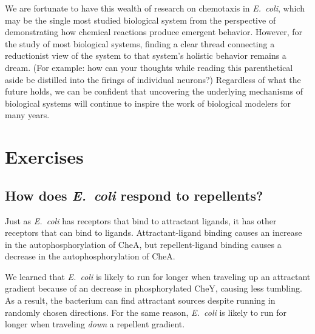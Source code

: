 We are fortunate to have this wealth of research on chemotaxis in \textit{E.~coli}, which may be the single most studied biological system from the perspective of demonstrating how chemical reactions produce emergent behavior. However, for the study of most biological systems, finding a clear thread connecting a reductionist view of the system to that system's holistic behavior remains a dream. (For example: how can your thoughts while reading this parenthetical aside be distilled into the firings of individual neurons?)  Regardless of what the future holds, we can be confident that uncovering the underlying mechanisms of biological systems will continue to inspire the work of biological modelers for many years.\\

\FloatBarrier
{}
\section{Exercises}

\subsection{How does \textit{E.~coli} respond to repellents?}

Just as \textit{E.~coli} has receptors that bind to attractant ligands, it has other receptors that can bind to  ligands. Attractant-ligand binding causes an increase in the autophosphorylation of CheA, but repellent-ligand binding causes a decrease in the autophosphorylation of CheA.\\

\begin{exercise}\end{exercise}

We learned that \textit{E.~coli} is likely to run for longer when traveling up an attractant gradient because of an decrease in phosphorylated CheY, causing less tumbling. As a result, the bacterium can find attractant sources despite running in randomly chosen directions. For the same reason, \textit{E.~coli} is likely to run for longer when traveling \textit{down} a repellent gradient.\\

